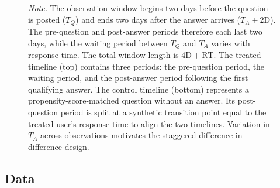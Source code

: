 \begin{figure}

\vspace{0.5em}
\parbox{\textwidth}{\footnotesize\textit{Note.} The observation window begins two days before the question is posted ($T_Q$) and ends two days after the answer arrives ($T_A+2\text{D}$). The pre-question and post-answer periods therefore each last two days, while the waiting period between $T_Q$ and $T_A$ varies with response time. The total window length is $4\text{D}+\text{RT}$. The treated timeline (top) contains three periods: the pre-question period, the waiting period, and the post-answer period following the first qualifying answer. The control timeline (bottom) represents a propensity-score-matched question without an answer. Its post-question period is split at a synthetic transition point equal to the treated user's response time to align the two timelines. Variation in $T_A$ across observations motivates the staggered difference-in-difference design.}
\end{figure}


\subsection{Data}

